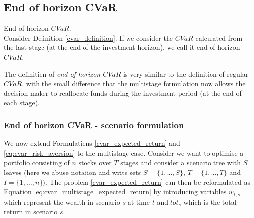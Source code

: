 \subsection{End of horizon CVaR}

\begin{defn}{End of horizon $CVaR$.} \\
Consider Definition \ref{cvar_definition}. If we consider the $CVaR$ calculated from the last stage (at the end of the investment horizon), we call it end of horizon $CVaR$.
\end{defn}
The definition of \textit{end of horizon $CVaR$} is very similar to the definition of regular $CVaR$, with the small difference that the multistage formulation now allows the decision maker to reallocate funds during the investment period (at the end of each stage). 

\subsubsection{End of horizon CVaR - scenario formulation}
\label{section:endofhorizoncvar_scenario_formulation}
We now extend Formulations \ref{cvar_expected_return} and \ref{eq:cvar_risk_aversion} to the multistage case. Consider we want to optimise a portfolio consisting of $n$ stocks over $T$ stages and consider a scenario tree with $S$ leaves (here we abuse notation and write sets $S=\{1,\dots,S\}$, $T=\{1,\dots,T\}$ and $I=\{1,\dots,n\})$. The problem \ref{cvar_expected_return} can then be reformulated as Equation \ref{eq:cvar_multistage_expected_return} by introducing variables $w_{t,s}$ which represent the wealth in scenario $s$ at time $t$ and $tot_s$ which is the total return in scenario $s$.

